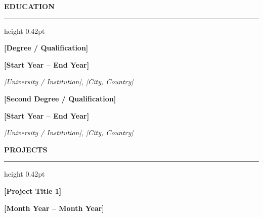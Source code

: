 \documentclass[10pt,a4paper]{article}
\begin{document}
\begin{minipage}[t]{128.7mm}
  \vspace*{4.5mm}
  \hspace*{2.2mm}%

  \begin{minipage}[t]{120.5mm}
    \raggedright
    \fontsize{11.2}{15.3}\selectfont


    {\fontsize{12.4}{15.8}\selectfont
      \bfseries EDUCATION\par}

    \vspace{0.45mm}
    \hrule height 0.42pt
    \vspace{5.4mm}


    {\bfseries [Degree / Qualification]\par}

    {\bfseries [Start Year -- End Year]\par}

    {\itshape [University / Institution], [City, Country]\par}

    \vspace{6.0mm}


    {\bfseries [Second Degree / Qualification]\par}

    {\bfseries [Start Year -- End Year]\par}

    {\itshape [University / Institution], [City, Country]\par}

    \vspace{6.0mm}


    {\fontsize{12.4}{15.8}\selectfont
      \bfseries PROJECTS\par}

    \vspace{0.45mm}
    \hrule height 0.42pt
    \vspace{5.6mm}


    {\bfseries [Project Title 1]\par}

    {\bfseries [Month Year -- Month Year]\par}


\end{minipage}
\end{minipage}
\end{document}
